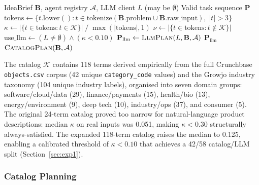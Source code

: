 \documentclass[preprint,12pt]{elsarticle}
\newcommand{\B}{\mathbf{B}}
\renewcommand{\P}{\mathbf{P}}
\newcommand{\calK}{\mathcal{K}}
\newcommand{\calA}{\mathcal{A}}
\newcommand{\nuu}{\nu}
\begin{document}
\begin{algorithm}[t]
\caption{Hybrid Research Planner}
\label{alg:hybrid}
\begin{algorithmic}[1]
\Require IdeaBrief $\B$, agent registry $\calA$, LLM client $L$ (may be $\emptyset$)
\Ensure Valid task sequence $\P$
\State $\text{tokens} \leftarrow \{t.\text{lower}() : t \in \text{tokenize}(\B.\text{problem} \cup \B.\text{raw\_input}),\; |t| > 3\}$
\State $\kappa \leftarrow |\{t \in \text{tokens} : t \in \calK\}|\;/\;\max(|\text{tokens}|, 1)$
\State $\nuu \leftarrow |\{t \in \text{tokens} : t \notin \calK\}|$
\State $\text{use\_llm} \leftarrow (L \ne \emptyset) \wedge (\kappa < 0.10)$
  \State $\P_{\text{llm}} \leftarrow \textsc{LlmPlan}(L, \B, \calA)$
  \If{$\P_{\text{llm}} \ne \emptyset \wedge \text{valid}(\P_{\text{llm}}, \calA)$}
    \State \Return $\P_{\text{llm}}$
  \EndIf
\EndIf
\State \Return $\textsc{CatalogPlan}(\B, \calA)$
\end{algorithmic}
\end{algorithm}

The catalog $\calK$ contains 118 terms derived empirically from the full
Crunchbase \texttt{objects.csv} corpus (42 unique \texttt{category\_code} values)
and the Growjo industry taxonomy (104 unique industry labels), organised into
seven domain groups: software/cloud/data (29), finance/payments (15),
health/bio (13), energy/environment (9), deep tech (10), industry/ops (37), and
consumer (5). The original 24-term catalog proved too narrow for natural-language
product descriptions: median $\kappa$ on real inputs was 0.051, making
$\kappa < 0.30$ structurally always-satisfied. The expanded 118-term catalog
raises the median to 0.125, enabling a calibrated threshold of $\kappa < 0.10$
that achieves a 42/58 catalog/LLM split (Section~\ref{sec:exp1}).

\subsubsection{Catalog Planning}
\end{document}
